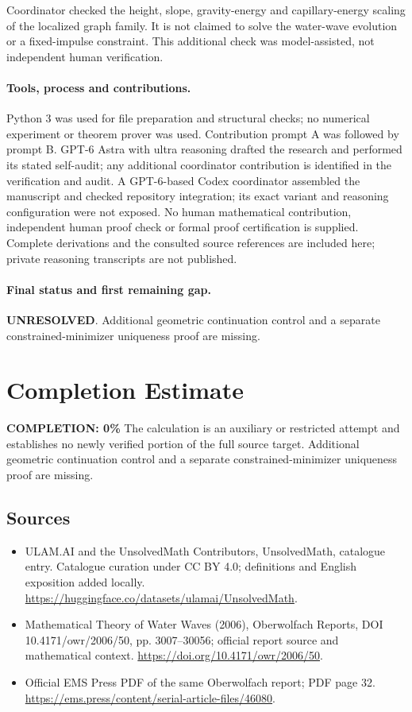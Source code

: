 \documentclass[11pt]{article}
\begin{document}
Coordinator checked the height, slope, gravity-energy and capillary-energy scaling of the localized graph family. It is not claimed to solve the water-wave evolution or a fixed-impulse constraint. This additional check was model-assisted, not independent human verification.

\paragraph{Tools, process and contributions.}
Python 3 was used for file preparation and structural checks; no numerical experiment or theorem prover was used. Contribution prompt A was followed by prompt B. GPT-6 Astra with ultra reasoning drafted the research and performed its stated self-audit; any additional coordinator contribution is identified in the verification and audit. A GPT-6-based Codex coordinator assembled the manuscript and checked repository integration; its exact variant and reasoning configuration were not exposed. No human mathematical contribution, independent human proof check or formal proof certification is supplied. Complete derivations and the consulted source references are included here; private reasoning transcripts are not published.

\paragraph{Final status and first remaining gap.}
\textbf{UNRESOLVED}. Additional geometric continuation control and a separate constrained-minimizer uniqueness proof are missing.

\section{Completion Estimate}
\noindent\textbf{COMPLETION: 0\%}
The calculation is an auxiliary or restricted attempt and establishes no newly verified portion of the full source target. Additional geometric continuation control and a separate constrained-minimizer uniqueness proof are missing.

\subsection{Sources}
\begin{itemize}
\item[\hypertarget{source:statement:1}{S1}] ULAM.AI and the UnsolvedMath Contributors, UnsolvedMath, catalogue entry. Catalogue curation under CC BY 4.0; definitions and English exposition added locally.
\url{https://huggingface.co/datasets/ulamai/UnsolvedMath}.
\item[\hypertarget{source:statement:2}{S2}] Mathematical Theory of Water Waves (2006), Oberwolfach Reports, DOI 10.4171/owr/2006/50, pp. 3007--30056; official report source and mathematical context.
\url{https://doi.org/10.4171/owr/2006/50}.
\item[\hypertarget{source:statement:3}{S3}] Official EMS Press PDF of the same Oberwolfach report; PDF page 32.
\url{https://ems.press/content/serial-article-files/46080}.
\end{itemize}
\label{end:statement}
\end{document}

